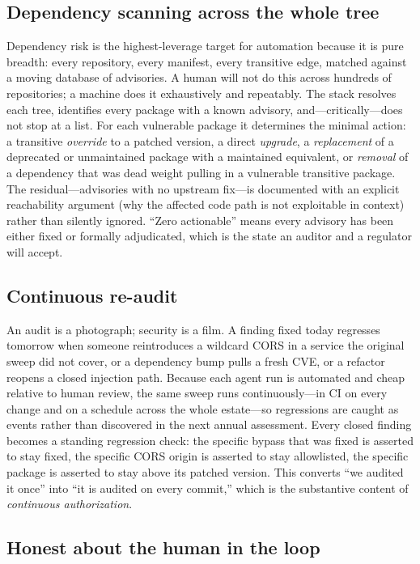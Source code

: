 \documentclass[11pt,letterpaper]{article}
\begin{document}
\subsection{Dependency scanning across the whole tree}

Dependency risk is the highest-leverage target for automation because it is pure
breadth: every repository, every manifest, every transitive edge, matched against
a moving database of advisories. A human will not do this across hundreds of
repositories; a machine does it exhaustively and repeatably. The stack resolves
each tree, identifies every package with a known advisory, and---critically---does
not stop at a list. For each vulnerable package it determines the minimal action:
a transitive \emph{override} to a patched version, a direct \emph{upgrade}, a
\emph{replacement} of a deprecated or unmaintained package with a maintained
equivalent, or \emph{removal} of a dependency that was dead weight pulling in a
vulnerable transitive package. The residual---advisories with no upstream fix---is
documented with an explicit reachability argument (why the affected code path is
not exploitable in context) rather than silently ignored. ``Zero actionable''
means every advisory has been either fixed or formally adjudicated, which is the
state an auditor and a regulator will accept.

\subsection{Continuous re-audit}

An audit is a photograph; security is a film. A finding fixed today regresses
tomorrow when someone reintroduces a wildcard CORS in a service the original sweep
did not cover, or a dependency bump pulls a fresh CVE, or a refactor reopens a
closed injection path. Because each agent run is automated and cheap relative to
human review, the same sweep runs continuously---in CI on every change and on a
schedule across the whole estate---so regressions are caught as events rather than
discovered in the next annual assessment. Every closed finding becomes a standing
regression check: the specific bypass that was fixed is asserted to stay fixed,
the specific CORS origin is asserted to stay allowlisted, the specific package is
asserted to stay above its patched version. This converts ``we audited it once''
into ``it is audited on every commit,'' which is the substantive content of
\emph{continuous authorization}.

\subsection{Honest about the human in the loop}
\end{document}
